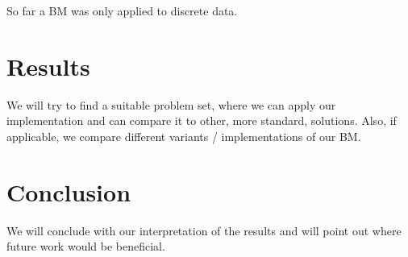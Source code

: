 \documentclass[
	12pt,
	a4paper,
	BCOR10mm,
	DIV14,
	headsepline,
	usegeometry,
]{scrreprt}
\begin{document}
So far a BM was only applied to discrete data.


\chapter{Results}

We will try to find a suitable problem set, where we can apply our implementation and can compare it to other, more standard, solutions. Also, if applicable, we compare different variants / implementations of our BM.


\chapter{Conclusion}

We will conclude with our interpretation of the results and will point out where future work would be beneficial.




\end{document}

